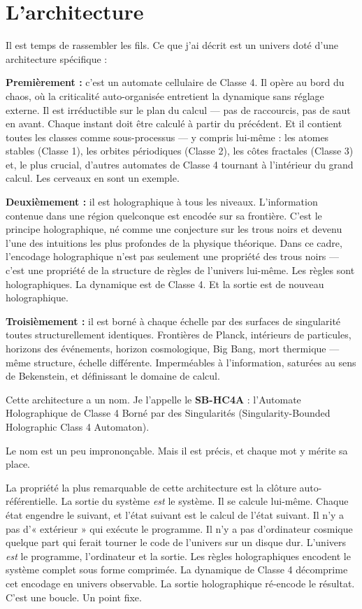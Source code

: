 \documentclass[11pt, twoside, openright]{book}
\begin{document}
\section*{L'architecture}

Il est temps de rassembler les fils. Ce que j'ai décrit est un univers doté d'une architecture spécifique :

\textbf{Premièrement :} c'est un automate cellulaire de Classe 4. Il opère au bord du chaos, où la criticalité auto-organisée entretient la dynamique sans réglage externe. Il est irréductible sur le plan du calcul --- pas de raccourcis, pas de saut en avant. Chaque instant doit être calculé à partir du précédent. Et il contient toutes les classes comme sous-processus --- y compris lui-même : les atomes stables (Classe 1), les orbites périodiques (Classe 2), les côtes fractales (Classe 3) et, le plus crucial, d'autres automates de Classe 4 tournant à l'intérieur du grand calcul. Les cerveaux en sont un exemple.

\textbf{Deuxièmement :} il est holographique à tous les niveaux. L'information contenue dans une région quelconque est encodée sur sa frontière. C'est le principe holographique, né comme une conjecture sur les trous noirs et devenu l'une des intuitions les plus profondes de la physique théorique. Dans ce cadre, l'encodage holographique n'est pas seulement une propriété des trous noirs --- c'est une propriété de la structure de règles de l'univers lui-même. Les règles sont holographiques. La dynamique est de Classe 4. Et la sortie est de nouveau holographique.

\textbf{Troisièmement :} il est borné à chaque échelle par des surfaces de singularité toutes structurellement identiques. Frontières de Planck, intérieurs de particules, horizons des événements, horizon cosmologique, Big Bang, mort thermique --- même structure, échelle différente. Imperméables à l'information, saturées au sens de Bekenstein, et définissant le domaine de calcul.

Cette architecture a un nom. Je l'appelle le \textbf{SB-HC4A} : l'Automate Holographique de Classe 4 Borné par des Singularités (Singularity-Bounded Holographic Class 4 Automaton).

Le nom est un peu imprononçable. Mais il est précis, et chaque mot y mérite sa place.

La propriété la plus remarquable de cette architecture est la clôture auto-référentielle. La sortie du système \textit{est} le système. Il se calcule lui-même. Chaque état engendre le suivant, et l'état suivant est le calcul de l'état suivant. Il n'y a pas d'« extérieur » qui exécute le programme. Il n'y a pas d'ordinateur cosmique quelque part qui ferait tourner le code de l'univers sur un disque dur. L'univers \textit{est} le programme, l'ordinateur et la sortie. Les règles holographiques encodent le système complet sous forme comprimée. La dynamique de Classe 4 décomprime cet encodage en univers observable. La sortie holographique ré-encode le résultat. C'est une boucle. Un point fixe.
\end{document}
